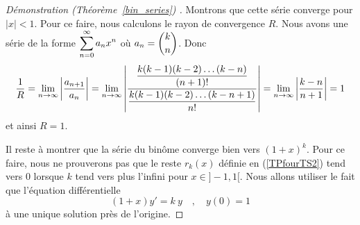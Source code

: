{\begin{proof}[Démonstration (Théorème~\ref{bin_series}) \theory]
Montrons que cette série converge pour $|x|<1$.  Pour ce faire, nous
calculons le rayon de convergence $R$.  Nous avons une série de la forme
$\displaystyle \sum_{n=0}^\infty a_n x^n$ où
$\displaystyle a_n = \binom{k}{n}$.  Donc 
\[
\frac{1}{R} = \lim_{n\rightarrow \infty} \left|\frac{a_{n+1}}{a_n}\right|
= \lim_{n\rightarrow \infty} \left|
\frac{\displaystyle \frac{k(k-1)(k-2)\ldots(k-n)}{(n+1)!}}
{\displaystyle \frac{k(k-1)(k-2)\ldots(k-n+1)}{n!}} \right|
= \lim_{n\rightarrow \infty} \left| \frac{k-n}{n+1} \right| = 1
\]
et ainsi $R=1$.

Il reste à montrer que la série du binôme converge bien vers
$(1+x)^k$.  Pour ce faire, nous ne prouverons pas que le reste
$r_k(x)$ définie en (\ref{TPfourTS2}) tend vers $0$ lorsque $k$ tend
vers plus l'infini pour $x \in ]-1,1[$.  Nous allons utiliser le fait
que l'équation différentielle
\begin{equation} \label{binODE}
(1+x) y'= k\ y \quad , \quad y(0)=1
\end{equation}
à une unique solution près de l'origine.


\end{proof}}
